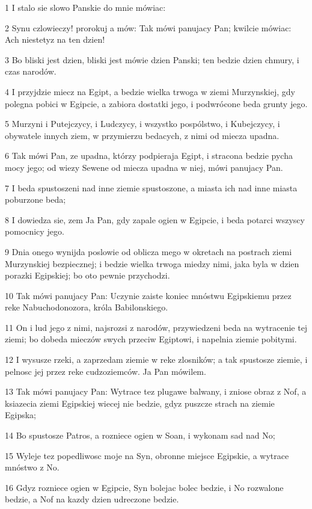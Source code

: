 \par 1 I stalo sie slowo Panskie do mnie mówiac:
\par 2 Synu czlowieczy! prorokuj a mów: Tak mówi panujacy Pan; kwilcie mówiac: Ach niestetyz na ten dzien!
\par 3 Bo bliski jest dzien, bliski jest mówie dzien Panski; ten bedzie dzien chmury, i czas narodów.
\par 4 I przyjdzie miecz na Egipt, a bedzie wielka trwoga w ziemi Murzynskiej, gdy polegna pobici w Egipcie, a zabiora dostatki jego, i podwrócone beda grunty jego.
\par 5 Murzyni i Putejczycy, i Ludczycy, i wszystko pospólstwo, i Kubejczycy, i obywatele innych ziem, w przymierzu bedacych, z nimi od miecza upadna.
\par 6 Tak mówi Pan, ze upadna, którzy podpieraja Egipt, i stracona bedzie pycha mocy jego; od wiezy Sewene od miecza upadna w niej, mówi panujacy Pan.
\par 7 I beda spustoszeni nad inne ziemie spustoszone, a miasta ich nad inne miasta poburzone beda;
\par 8 I dowiedza sie, zem Ja Pan, gdy zapale ogien w Egipcie, i beda potarci wszyscy pomocnicy jego.
\par 9 Dnia onego wynijda poslowie od oblicza mego w okretach na postrach ziemi Murzynskiej bezpiecznej; i bedzie wielka trwoga miedzy nimi, jaka byla w dzien porazki Egipskiej; bo oto pewnie przychodzi.
\par 10 Tak mówi panujacy Pan: Uczynie zaiste koniec mnóstwu Egipskiemu przez reke Nabuchodonozora, króla Babilonskiego.
\par 11 On i lud jego z nimi, najsrozsi z narodów, przywiedzeni beda na wytracenie tej ziemi; bo dobeda mieczów swych przeciw Egiptowi, i napelnia ziemie pobitymi.
\par 12 I wysusze rzeki, a zaprzedam ziemie w reke zlosników; a tak spustosze ziemie, i pelnosc jej przez reke cudzoziemców. Ja Pan mówilem.
\par 13 Tak mówi panujacy Pan: Wytrace tez plugawe balwany, i zniose obraz z Nof, a ksiazecia ziemi Egipskiej wiecej nie bedzie, gdyz puszcze strach na ziemie Egipska;
\par 14 Bo spustosze Patros, a rozniece ogien w Soan, i wykonam sad nad No;
\par 15 Wyleje tez popedliwosc moje na Syn, obronne miejsce Egipskie, a wytrace mnóstwo z No.
\par 16 Gdyz rozniece ogien w Egipcie, Syn bolejac bolec bedzie, i No rozwalone bedzie, a Nof na kazdy dzien udreczone bedzie.
